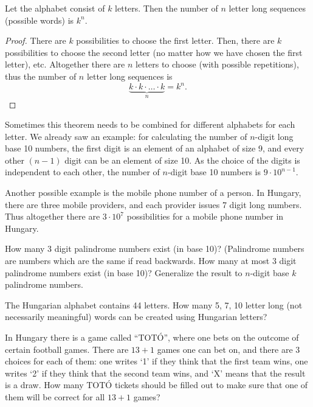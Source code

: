 \begin{theorem}\label{thm:sequence}
Let the alphabet consist of $k$ letters. 
Then the number of $n$ letter long sequences (possible words) is $k^n$. 
\end{theorem}

\begin{proof}
There are $k$ possibilities to choose the first letter. 
Then, there are $k$ possibilities to choose the second letter (no matter how we have chosen the first letter), etc. 
Altogether there are $n$ letters to choose (with possible repetitions), 
thus the number of $n$ letter long sequences is 
\[
\underbrace{k \cdot k \cdot \dots \cdot k}_{n} = k^n. 
\]
\end{proof}

Sometimes this theorem needs to be combined for different alphabets for each letter. 
We already saw an example: 
for calculating the number of $n$-digit long base 10 numbers, 
the first digit is an element of an alphabet of size 9, 
and every other $(n-1)$ digit can be an element of size 10. 
As the choice of the digits is independent to each other, 
the number of $n$-digit base 10 numbers is $9 \cdot 10^{n-1}$. 

Another possible example is the mobile phone number of a person. 
In Hungary, there are three mobile providers, 
and each provider issues 7 digit long numbers. 
Thus altogether there are $3 \cdot 10^7$ possibilities for a mobile phone number in Hungary. 

\begin{exercise}\label{ex:palindrome}
How many 3 digit palindrome numbers exist (in base 10)? 
(Palindrome numbers are numbers which are the same if read backwards. 
How many at most 3 digit palindrome numbers exist (in base 10)? 
Generalize the result to $n$-digit base $k$ palindrome numbers. 
\end{exercise}

\begin{exercise}\label{ex:Hungarianwords}
The Hungarian alphabet contains 44 letters. 
How many 5, 7, 10 letter long (not necessarily meaningful) words can be created using Hungarian letters? 
\end{exercise}

\begin{exercise}\label{ex:toto}
In Hungary there is a game called ``TOTÓ'', 
where one bets on the outcome of certain football games. 
There are $13+1$ games one can bet on, 
and there are 3 choices for each of them: 
one writes `1' if they think that the first team wins, 
one writes `2' if they think that the second team wins, 
and `X' means that the result is a draw. 
How many TOTÓ tickets should be filled out to make sure that one of them will be correct for all $13+1$ games? 
\end{exercise}

